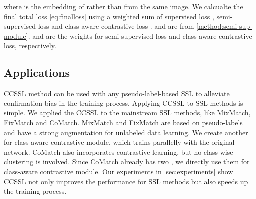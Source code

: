 \documentclass[10pt,twocolumn,letterpaper]{article}
\begin{document}
where  is the embedding of  rather than  from the same image. We calcualte the final total loss \cref{eq:finalloss} using a weighted sum of supervised loss , semi-supervised loss  and class-aware contrastive loss .  and  are from \cref{method:semi-sup-module}.  and  are the weights for semi-supervised loss and class-aware contrastive loss, respectively.


\subsection{Applications}

CCSSL method can be used with any pseudo-label-based SSL to alleviate confirmation bias in the training process. Applying CCSSL to SSL methods is simple. We applied the CCSSL to the mainstream SSL methods, like MixMatch\cite{berthelot2019mixmatch}, FixMatch\cite{sohn2020fixmatch} and CoMatch\cite{li2021comatch}. MixMatch and FixMatch are based on pseudo-labels and have a strong augmentation  for unlabeled data learning. We create another  for class-aware contrastive module, which trains parallelly with the original network. CoMatch also incorporates contrastive learning, but no class-wise clustering is involved. Since CoMatch already has two , we directly use them for class-aware contrastive module.  Our experiments in \cref{sec:experiments} show CCSSL not only improves the performance for SSL methods but also speeds up the training process. 
\end{document}
